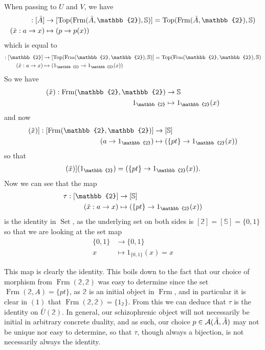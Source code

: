 \documentclass[12pt,a4paper]{article}
\DeclareMathOperator{\Set}{Set}
\DeclareMathOperator{\Frm}{Frm}
\DeclareMathOperator{\Top}{Top}
\def\HomA{\ensuremath\mathcal{A}}
\def\t{\ensuremath\tilde}
\begin{document}
When passing to $U$ and $V$, we have
\begin{align*}
	[\epsilon_{\t A}]: [\t A] &\to [\Top(\Frm(\t A, \mathbb{2}), \mathbb{S})] = \Top(\Frm(\t A, \mathbb{2}), \mathbb{S})\\
	(\t x: a \to x) &\mapsto (p \to p(x))
\end{align*}
which is equal to
\begin{align}
	[\epsilon_{\mathbb{2}}]: [\mathbb{2}] &\to [\Top(\Frm(\mathbb{2}, \mathbb{2}), \mathbb{S})] = \Top(\Frm(\mathbb{2}, \mathbb{2}), \mathbb{S})\\
	(\t x: a \to x) &\mapsto (1_{\mathbb{2}} \to 1_{\mathbb{2}}(x))
\end{align}
So we have 
\begin{align*}
	[\epsilon_{\mathbb{2}}](\t x): \Frm(\mathbb{2},\mathbb{2}) &\to \mathbb{S}\\
	1_{\mathbb{2}} &\mapsto 1_{\mathbb{2}}(x)
\end{align*}
and now
\begin{align*}
	[[\epsilon_{\mathbb{2}}](\t x)]: [\Frm(\mathbb{2},\mathbb{2})] &\to [\mathbb{S}]\\
	(a \to 1_{\mathbb{2}}) &\mapsto (\{pt\} \to1_{\mathbb{2}}(x))
\end{align*}
so that 
\begin{align*}
	[[\epsilon_{\mathbb{2}}](\t x)](1_{\mathbb{2}}) = (\{pt\} \to 1_{\mathbb{2}}(x)).
\end{align*}
Now we can see that the map \begin{align*}
	\tau: [\mathbb{2}] &\to [\mathbb{S}]\\
	(\t x: a \to x) &\mapsto (\{pt\} \to 1_{\mathbb{2}}(x))
\end{align*}
is the identity in $\Set$, as the underlying set on both sides is $[\mathbb{2}] = [\mathbb{S}] = \{0,1\}$ so that we are looking at the set map \begin{align*}
	\{0,1\} &\to \{0,1\}\\
	x &\mapsto 1_{\{0,1\}}(x)= x
\end{align*}

This map is clearly the identity. This boils down to the fact that our choice of morphism from $\Frm(\mathbb{2},\mathbb{2})$ was easy to determine since the set $\Frm(\mathbb{2},A) = \{pt\}$, as $\mathbb{2}$ is an initial object in $\Frm$, and in particular it is clear in $(1)$ that $\Frm(\mathbb{2},\mathbb{2}) = \{1_{\mathbb{2}}\}$. From this we can deduce that $\tau$ is the identity on $\bar U(\mathbb{2})$.
In general, our schizophrenic object will not necessarily be initial in arbitrary concrete duality, and as such, our choice $p \in \HomA(\t A, \t A)$ may not be unique nor easy to determine, so that $\tau$, though always a bijection, is not necessarily always the identity. 
\end{document}
